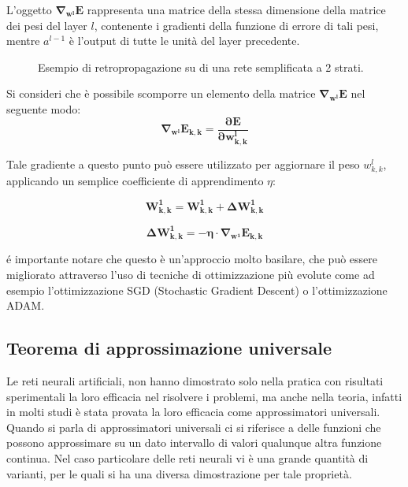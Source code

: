 L'oggetto $\mathbf{\nabla_{w^{l}} E}$ rappresenta una matrice della stessa dimensione della matrice dei pesi del layer $l$, contenente i gradienti della funzione di errore di tali pesi,
mentre $a^{l-1}$ è l'output di tutte le unità del layer precedente.

\begin{figure}
    \centering
    \hspace{-25pt}
    
    \caption{Esempio di retropropagazione su di una rete semplificata a 2 strati.}
    \label{fig:backpropagation}
    \vspace{35pt}
\end{figure}

Si consideri che è possibile scomporre un elemento della matrice $\mathbf{\nabla_{w^{l}} E}$ nel seguente modo:
\begin{equation}
    \mathbf{\nabla_{w^{l}} E_{k,k} = \frac{\partial E}{\partial w_{k,k}^{l}}} 
\end{equation}

Tale gradiente a questo punto può essere utilizzato per aggiornare il peso $w_{k,k}^{l}$,
applicando un semplice coefficiente di apprendimento $\eta$:

\begin{equation}
    \mathbf{W_{k,k}^1 = W_{k,k}^1 + \Delta W_{k,k}^1}
\end{equation}

\begin{equation}
    \mathbf{\Delta W_{k,k}^1 = - \eta \cdot \nabla_{w^1}E_{k,k}}
\end{equation}

é importante notare che questo è un'approccio molto basilare, che può essere migliorato attraverso l'uso di tecniche di ottimizzazione
più evolute come ad esempio l'ottimizzazione SGD (Stochastic Gradient Descent) o l'ottimizzazione ADAM.

\subsection{Teorema di approssimazione universale}

Le reti neurali artificiali, non hanno dimostrato solo nella pratica con risultati sperimentali la loro efficacia nel risolvere
i problemi, ma anche nella teoria, infatti in molti studi è stata provata la loro efficacia come approssimatori universali.
Quando si parla di approssimatori universali ci si riferisce a delle funzioni che possono approssimare su un dato intervallo di valori
qualunque altra funzione continua. Nel caso particolare delle reti neurali vi è una grande quantità di varianti, per le quali
si ha una diversa dimostrazione per tale proprietà.

